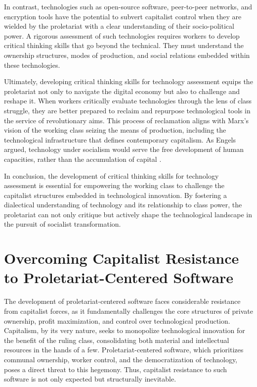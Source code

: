 \begin{refsection}
In contrast, technologies such as open-source software, peer-to-peer networks, and encryption tools have the potential to subvert capitalist control when they are wielded by the proletariat with a clear understanding of their socio-political power. A rigorous assessment of such technologies requires workers to develop critical thinking skills that go beyond the technical. They must understand the ownership structures, modes of production, and social relations embedded within these technologies.

Ultimately, developing critical thinking skills for technology assessment equips the proletariat not only to navigate the digital economy but also to challenge and reshape it. When workers critically evaluate technologies through the lens of class struggle, they are better prepared to reclaim and repurpose technological tools in the service of revolutionary aims. This process of reclamation aligns with Marx’s vision of the working class seizing the means of production, including the technological infrastructure that defines contemporary capitalism. As Engels argued, technology under socialism would serve the free development of human capacities, rather than the accumulation of capital \cite[pp.~322]{engels_anti_duhring}.

In conclusion, the development of critical thinking skills for technology assessment is essential for empowering the working class to challenge the capitalist structures embedded in technological innovation. By fostering a dialectical understanding of technology and its relationship to class power, the proletariat can not only critique but actively shape the technological landscape in the pursuit of socialist transformation.

\section{Overcoming Capitalist Resistance to Proletariat-Centered Software}

The development of proletariat-centered software faces considerable resistance from capitalist forces, as it fundamentally challenges the core structures of private ownership, profit maximization, and control over technological production. Capitalism, by its very nature, seeks to monopolize technological innovation for the benefit of the ruling class, consolidating both material and intellectual resources in the hands of a few. Proletariat-centered software, which prioritizes communal ownership, worker control, and the democratization of technology, poses a direct threat to this hegemony. Thus, capitalist resistance to such software is not only expected but structurally inevitable.


\end{refsection}
